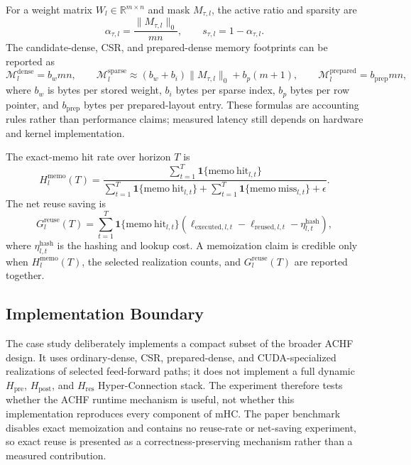 \documentclass{article}
\begin{document}
For a weight matrix $W_l\in\mathbb{R}^{m\times n}$ and mask
$M_{\tau,l}$, the active ratio and sparsity are
\begin{equation}
\alpha_{\tau,l}
=
\frac{\|M_{\tau,l}\|_0}{mn},
\qquad
s_{\tau,l}=1-\alpha_{\tau,l}.
\label{eq:achf-active-sparsity}
\end{equation}
The candidate-dense, CSR, and prepared-dense memory footprints can be reported as
\begin{equation}
\mathcal{M}^{\mathrm{dense}}_l
=
b_w mn,
\qquad
\mathcal{M}^{\mathrm{sparse}}_l
\approx
(b_w+b_i)\|M_{\tau,l}\|_0+b_p(m+1),
\qquad
\mathcal{M}^{\mathrm{prepared}}_l
=
b_{\mathrm{prep}} mn,
\label{eq:achf-memory-footprint}
\end{equation}
where $b_w$ is bytes per stored weight, $b_i$ bytes per sparse index, $b_p$
bytes per row pointer, and $b_{\mathrm{prep}}$ bytes per prepared-layout entry. These formulas
are accounting rules rather than performance claims; measured latency still
depends on hardware and kernel implementation.

The exact-memo hit rate over horizon $T$ is
\begin{equation}
H^{\mathrm{memo}}_l(T)
=
\frac{
\sum_{t=1}^{T}\mathbf{1}\{\mathrm{memo\ hit}_{l,t}\}
}{
\sum_{t=1}^{T}\mathbf{1}\{\mathrm{memo\ hit}_{l,t}\}
+
\sum_{t=1}^{T}\mathbf{1}\{\mathrm{memo\ miss}_{l,t}\}
+
\epsilon
}.
\label{eq:achf-cache-hit-rate}
\end{equation}
The net reuse saving is
\begin{equation}
G^{\mathrm{reuse}}_l(T)
=
\sum_{t=1}^{T}
\mathbf{1}\{\mathrm{memo\ hit}_{l,t}\}
\left(
\ell_{\mathrm{executed},l,t}
-
\ell_{\mathrm{reused},l,t}
-
\eta^{\mathrm{hash}}_{l,t}
\right),
\label{eq:achf-reuse-saving}
\end{equation}
where $\eta^{\mathrm{hash}}_{l,t}$ is the hashing and lookup cost. A memoization
claim is credible only when $H^{\mathrm{memo}}_l(T)$, the selected realization
counts, and $G^{\mathrm{reuse}}_l(T)$ are reported together.

\subsection{Implementation Boundary}

The case study deliberately implements a compact subset of the broader ACHF
design. It uses ordinary-dense, CSR, prepared-dense, and CUDA-specialized realizations of
selected feed-forward paths; it does not implement a full dynamic
$H_{\mathrm{pre}}$, $H_{\mathrm{post}}$, and $H_{\mathrm{res}}$
Hyper-Connection stack. The experiment therefore tests whether the ACHF
runtime mechanism is useful, not whether this implementation reproduces every
component of mHC. The paper benchmark disables exact memoization and contains
no reuse-rate or net-saving experiment, so exact reuse is presented as a
correctness-preserving mechanism rather than a measured contribution.
\end{document}
